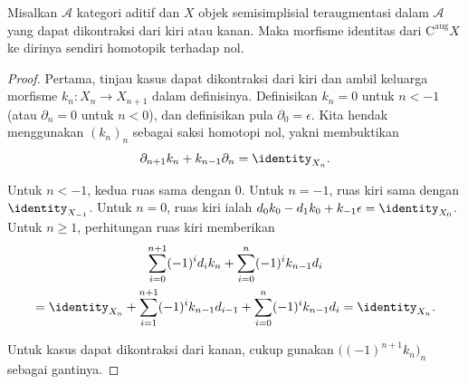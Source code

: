 \begin{proposition}\label{prop:contractible-null-homotopic}
	Misalkan $\mathcal{A}$ kategori aditif dan $X$ objek semisimplisial
	teraugmentasi dalam $\mathcal{A}$ yang dapat dikontraksi dari kiri atau
	kanan. Maka morfisme identitas dari
	$\mathrm{C}^{\mathrm{aug}}X$ ke dirinya sendiri homotopik terhadap nol.
\end{proposition}
\begin{proof}
	Pertama, tinjau kasus dapat dikontraksi dari kiri dan ambil keluarga
	morfisme $k_n:X_n\to X_{n+1}$ dalam definisinya. Definisikan $k_n=0$ untuk
	$n<-1$ (atau $\partial_n=0$ untuk $n<0$), dan definisikan pula
	$\partial_0=\epsilon$. Kita hendak menggunakan $(k_n)_n$ sebagai saksi
	homotopi nol, yakni membuktikan
	\[
	\partial_{n+1}k_n+k_{n-1}\partial_n=\identity_{X_n}.
	\]

	Untuk $n<-1$, kedua ruas sama dengan $0$. Untuk $n=-1$, ruas kiri sama
	dengan $\identity_{X_{-1}}$. Untuk $n=0$, ruas kiri ialah
	$d_0k_0-d_1k_0+k_{-1}\epsilon=\identity_{X_0}$. Untuk $n\geq1$,
	perhitungan ruas kiri memberikan
	\begin{multline*}
		\sum_{i=0}^{n+1}(-1)^id_ik_n
		+\sum_{i=0}^n(-1)^ik_{n-1}d_i\\
		=\identity_{X_n}
		+\sum_{i=1}^{n+1}(-1)^ik_{n-1}d_{i-1}
		+\sum_{i=0}^n(-1)^ik_{n-1}d_i
		=\identity_{X_n}.
	\end{multline*}

	Untuk kasus dapat dikontraksi dari kanan, cukup gunakan
	$\bigl((-1)^{n+1}k_n\bigr)_n$ sebagai gantinya.
\end{proof}
